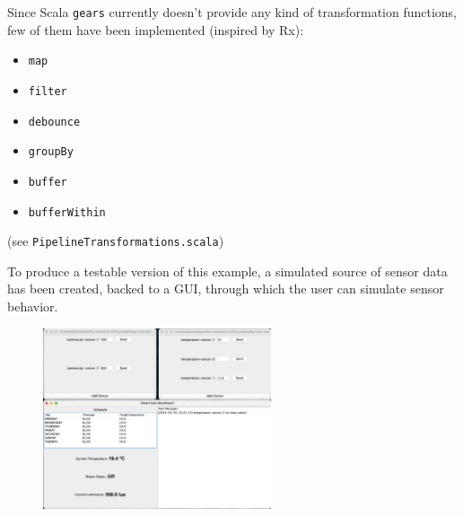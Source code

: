 \documentclass[aspectratio=169,xcolor=dvipsnames]{beamer}
\begin{document}

\begin{frame}
    
\end{frame}


\begin{frame}
    Since Scala \texttt{gears} currently doesn't provide any kind of transformation functions, few of them have been implemented (inspired by Rx):
    \begin{itemize}
        \item \texttt{map}
        \item \texttt{filter}
        \item \texttt{debounce}
        \item \texttt{groupBy}
        \item \texttt{buffer}
        \item \texttt{bufferWithin}
    \end{itemize}
    \footnotesize
    (see \texttt{PipelineTransformations.scala})
\end{frame}


\begin{frame}
    
\end{frame}


\begin{frame}
    \footnotesize
    To produce a testable version of this example, a simulated source of sensor data has been created, backed to a GUI, through which the user can simulate sensor behavior.
    \begin{figure}
        \centering
        \includegraphics[width=0.6\textwidth]{./images/smart-hub.png}
    \end{figure}
\end{frame}
\end{document}
